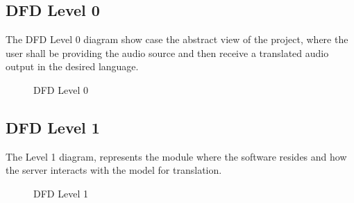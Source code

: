 \subsection{DFD Level 0}
{\normalsize{The DFD Level 0 diagram show case the abstract view of the project, where the user shall be providing the audio source and then receive a translated audio output in the desired language.}}
\newline
\newline
\begin{figure}[h]
  \begin{center}
  \caption{DFD Level 0}
  \end{center}
\end{figure}

\clearpage
\subsection{DFD Level 1}
{\normalsize{The Level 1 diagram, represents the module where the software resides and how the server interacts with the model for translation.}}
\newline
\newline
\begin{figure}[h]
  \begin{center}
  \caption{DFD Level 1}
  \end{center}
\end{figure}
\newpage

